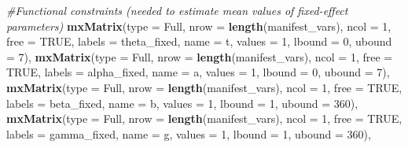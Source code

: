 \documentclass[
12pt, %
twoside,
english]{guelphthesis}
\newenvironment{Shaded}{\begin{snugshade}}{\end{snugshade}}
\newcommand{\AttributeTok}[1]{\textcolor[rgb]{0.13,0.29,0.53}{#1}}
\newcommand{\CommentTok}[1]{\textcolor[rgb]{0.56,0.35,0.01}{\textit{#1}}}
\newcommand{\ConstantTok}[1]{\textcolor[rgb]{0.56,0.35,0.01}{#1}}
\newcommand{\DecValTok}[1]{\textcolor[rgb]{0.00,0.00,0.81}{#1}}
\newcommand{\FunctionTok}[1]{\textcolor[rgb]{0.13,0.29,0.53}{\textbf{#1}}}
\newcommand{\NormalTok}[1]{#1}
\newcommand{\StringTok}[1]{\textcolor[rgb]{0.31,0.60,0.02}{#1}}
\begin{document}
\begin{Shaded}
\begin{Highlighting}[numbers=left,,]
  \CommentTok{\#Functional constraints (needed to estimate mean values of fixed{-}effect parameters)}
  \FunctionTok{mxMatrix}\NormalTok{(}\AttributeTok{type =} \StringTok{\textquotesingle{}Full\textquotesingle{}}\NormalTok{, }\AttributeTok{nrow =} \FunctionTok{length}\NormalTok{(manifest\_vars), }\AttributeTok{ncol =} \DecValTok{1}\NormalTok{, }\AttributeTok{free =} \ConstantTok{TRUE}\NormalTok{, }
           \AttributeTok{labels =} \StringTok{\textquotesingle{}theta\_fixed\textquotesingle{}}\NormalTok{, }\AttributeTok{name =} \StringTok{\textquotesingle{}t\textquotesingle{}}\NormalTok{, }\AttributeTok{values =} \DecValTok{1}\NormalTok{, }\AttributeTok{lbound =} \DecValTok{0}\NormalTok{,  }\AttributeTok{ubound =} \DecValTok{7}\NormalTok{), }
  \FunctionTok{mxMatrix}\NormalTok{(}\AttributeTok{type =} \StringTok{\textquotesingle{}Full\textquotesingle{}}\NormalTok{, }\AttributeTok{nrow =} \FunctionTok{length}\NormalTok{(manifest\_vars), }\AttributeTok{ncol =} \DecValTok{1}\NormalTok{, }\AttributeTok{free =} \ConstantTok{TRUE}\NormalTok{, }
           \AttributeTok{labels =} \StringTok{\textquotesingle{}alpha\_fixed\textquotesingle{}}\NormalTok{, }\AttributeTok{name =} \StringTok{\textquotesingle{}a\textquotesingle{}}\NormalTok{, }\AttributeTok{values =} \DecValTok{1}\NormalTok{, }\AttributeTok{lbound =} \DecValTok{0}\NormalTok{,  }\AttributeTok{ubound =} \DecValTok{7}\NormalTok{), }
  \FunctionTok{mxMatrix}\NormalTok{(}\AttributeTok{type =} \StringTok{\textquotesingle{}Full\textquotesingle{}}\NormalTok{, }\AttributeTok{nrow =} \FunctionTok{length}\NormalTok{(manifest\_vars), }\AttributeTok{ncol =} \DecValTok{1}\NormalTok{, }\AttributeTok{free =} \ConstantTok{TRUE}\NormalTok{, }
           \AttributeTok{labels =} \StringTok{\textquotesingle{}beta\_fixed\textquotesingle{}}\NormalTok{, }\AttributeTok{name =} \StringTok{\textquotesingle{}b\textquotesingle{}}\NormalTok{, }\AttributeTok{values =} \DecValTok{1}\NormalTok{, }\AttributeTok{lbound =} \DecValTok{1}\NormalTok{, }\AttributeTok{ubound =} \DecValTok{360}\NormalTok{),}
  \FunctionTok{mxMatrix}\NormalTok{(}\AttributeTok{type =} \StringTok{\textquotesingle{}Full\textquotesingle{}}\NormalTok{, }\AttributeTok{nrow =} \FunctionTok{length}\NormalTok{(manifest\_vars), }\AttributeTok{ncol =} \DecValTok{1}\NormalTok{, }\AttributeTok{free =} \ConstantTok{TRUE}\NormalTok{, }
           \AttributeTok{labels =} \StringTok{\textquotesingle{}gamma\_fixed\textquotesingle{}}\NormalTok{, }\AttributeTok{name =} \StringTok{\textquotesingle{}g\textquotesingle{}}\NormalTok{, }\AttributeTok{values =} \DecValTok{1}\NormalTok{, }\AttributeTok{lbound =} \DecValTok{1}\NormalTok{, }\AttributeTok{ubound =} \DecValTok{360}\NormalTok{), }


\end{Highlighting}
\end{Shaded}
\end{document}
